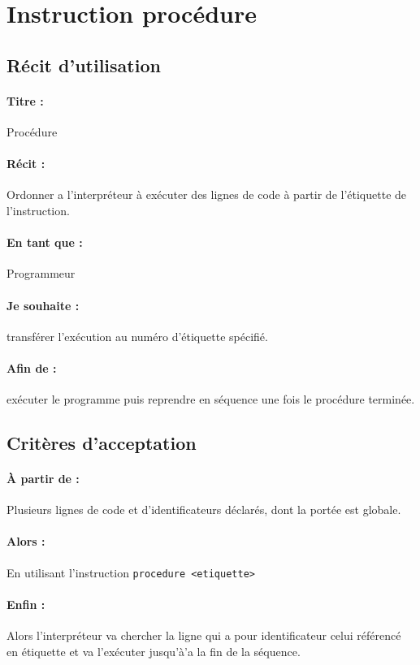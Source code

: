 \section{Instruction procédure}

	\subsection*{Récit d'utilisation}

	\paragraph{Titre : } Procédure
	\paragraph{Récit : } Ordonner a l'interpréteur à exécuter des lignes de code à partir de l'étiquette de l'instruction.
	\paragraph{En tant que : } Programmeur
	\paragraph{Je souhaite : } transférer l'exécution au numéro d'étiquette spécifié.
	\paragraph{Afin de : } exécuter le programme puis reprendre en séquence une fois le procédure terminée.

	\subsection*{Critères d'acceptation}

	\paragraph{À partir de : } Plusieurs lignes de code et d'identificateurs déclarés, dont la portée est globale.

	\paragraph{Alors : } En utilisant l'instruction
    \verb|procedure <etiquette>|

	\paragraph{Enfin : } Alors l'interpréteur va chercher la ligne qui a pour identificateur celui référencé
						 en étiquette et va l'exécuter jusqu'à'a la fin de la séquence.